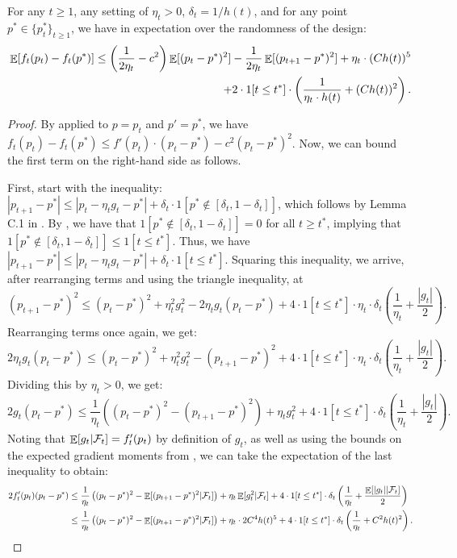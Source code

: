 \begin{claim} \label{claim:onestep}
    For any $t \geq 1$, any setting of $\eta_t > 0$, $\delta_t = 1/h(t)$, and for any point $p^* \in \{p^*_t\}_{t\geq 1}$, we have in expectation over the randomness of the design:
    \begin{align*}
       \mathop{\mathbb{E}}[f_t(p_t) - f_t(p^*)] \leq \left(\frac{1}{2\eta_t} - c^2\right) \mathop{\mathbb{E}}[(p_t - p^*)^2] - \frac{1}{2 \eta_t} \mathop{\mathbb{E}}[(p_{t+1}-p^*)^2] + \eta_t \cdot (C h(t))^5  \\+ 2 \cdot 1[t \leq t^*] \cdot \left(\frac{1}{\eta_t \cdot h(t)} + (C h(t))^2\right).
    \end{align*}
\end{claim}
\begin{proof}
    By  applied to $p = p_t$ and $p' = p^*$, we have $f_t(p_t) - f_t(p^*) \leq f'(p_t) \cdot (p_t - p^*) - c^2 (p_t-p^*)^2$. Now, we can bound the first term on the right-hand side as follows. 

    First, start with the inequality: $|p_{t+1} - p^*| \leq |p_t - \eta_t g_t - p^*| + \delta_t \cdot 1[p^* \not\in [\delta_t, 1-\delta_t]]$, which follows by Lemma C.1 in \citet{dai2023clip}. By , we have that $1[p^* \not\in [\delta_t, 1-\delta_t]] = 0$ for all $t \geq t^*$, implying that $1[p^* \not\in [\delta_t, 1-\delta_t]] \leq 1[t \leq t^*]$. Thus, we have $|p_{t+1} - p^*| \leq |p_t - \eta_t g_t - p^*| + \delta_t \cdot 1[t \leq t^*]$. Squaring this inequality, we arrive, after rearranging terms and using the triangle inequality, at
    \[
    (p_{t+1} - p^*)^2 \leq (p_t-p^*)^2 + \eta_t^2 g_t^2 - 2 \eta_t g_t (p_t - p^*) + 4 \cdot 1[t \leq t^*] \cdot \eta_t \cdot \delta_t \left(\frac{1}{\eta_t} + \frac{|g_t|}{2}\right).
    \]
    Rearranging terms once again, we get:
    \[
    2 \eta_t g_t (p_t - p^*)  \leq (p_t-p^*)^2 + \eta_t^2 g_t^2 - (p_{t+1} - p^*)^2 + 4 \cdot 1[t \leq t^*] \cdot \eta_t \cdot \delta_t \left(\frac{1}{\eta_t} + \frac{|g_t|}{2}\right).
    \]
    Dividing this by $\eta_t > 0$, we get:
    \[
    2 g_t (p_t - p^*)  \leq \frac{1}{\eta_t} \left((p_t-p^*)^2 - (p_{t+1} - p^*)^2\right) + \eta_t g_t^2  + 4 \cdot 1[t \leq t^*] \cdot \delta_t \left(\frac{1}{\eta_t} + \frac{|g_t|}{2}\right).
    \]
    Noting that $\mathop{\mathbb{E}}[g_t | \mathcal{F}_t] = f'_t(p_t)$ by definition of $g_t$, as well as using the bounds on the expected gradient moments from , we can take the expectation of the last inequality to obtain:
    \begin{align*}
        2 f'_t(p_t) (p_t - p^*) &\leq \frac{1}{\eta_t} \left((p_t-p^*)^2 - \mathop{\mathbb{E}}[(p_{t+1} - p^*)^2 | \mathcal{F}_t] \right) + \eta_t \mathop{\mathbb{E}}[g_t^2 | \mathcal{F}_t]  + 4 \cdot 1[t \leq t^*] \cdot \delta_t \left(\frac{1}{\eta_t} + \frac{\mathop{\mathbb{E}}[|g_t| | \mathcal{F}_t]}{2}\right) \\
        &\leq \frac{1}{\eta_t} \left((p_t-p^*)^2 - \mathop{\mathbb{E}}[(p_{t+1} - p^*)^2 | \mathcal{F}_t]\right) + \eta_t \cdot 2C^4 h(t)^5  + 4 \cdot 1[t \leq t^*] \cdot \delta_t \left(\frac{1}{\eta_t} + C^2 h(t)^2\right).
    \end{align*}


\end{proof}
